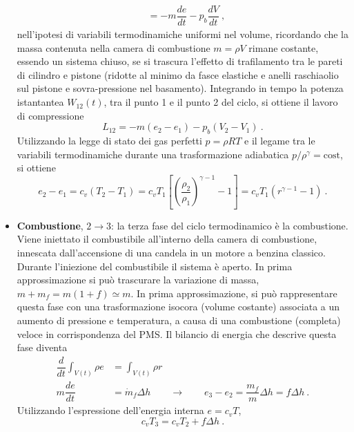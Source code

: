 \begin{itemize}
\begin{equation}
\begin{aligned}
  & = - m \dfrac{d e}{d t} - p_b \dfrac{d V}{d t} \ ,
\end{aligned}
\end{equation}
nell'ipotesi di variabili termodinamiche uniformi nel volume, ricordando che la massa contenuta nella camera di combustione $m = \rho V$ rimane costante, essendo un sistema chiuso, se si trascura l'effetto di trafilamento tra le pareti di cilindro e pistone (ridotte al minimo da fasce elastiche e anelli raschiaolio sul pistone e sovra-pressione nel basamento).
\newline \noindent
Integrando in tempo la potenza istantantea $W_{12}(t)$, tra il punto 1 e il punto 2 del ciclo, si ottiene il lavoro di compressione
\begin{equation}
 L_{12} = - m (e_2 - e_1) - p_b ( V_2 - V_1 ) \ .
\end{equation}
Utilizzando la legge di stato dei gas perfetti $p = \rho R T$ e il legame tra le variabili termodinamiche durante una trasformazione adiabatica $p/\rho^\gamma = \text{cost}$, si ottiene
\begin{equation}
 e_2 - e_1 = c_v ( T_2 - T_1 ) = c_v T_1 \left[ \left( \dfrac{\rho_2}{\rho_1} \right)^{\gamma-1} - 1 \right] = c_v T_1 \left( r^{\gamma-1} - 1\right) \ .
\end{equation}

\item \textbf{Combustione}, $2 \rightarrow 3$: la terza fase del ciclo termodinamico è la combustione. Viene iniettato il combustibile all'interno della camera di combustione, innescata dall'accensione di una candela in un motore a benzina classico. Durante l'iniezione del combustibile il sistema è aperto. In prima approssimazione si può trascurare la variazione di massa, $m + m_f = m ( 1 + f ) \simeq m$. In prima approssimazione, si può rappresentare questa fase con una trasformazione isocora (volume costante) associata a un aumento di pressione e temperatura, a causa di una combustione (completa) veloce in corrispondenza del PMS. Il bilancio di energia che descrive questa fase diventa
\begin{equation}
\begin{aligned}
 \dfrac{d}{dt} \displaystyle\int_{V(t)} \rho e & = \int_{V(t)} \rho r \\
 m \dfrac{d e}{d t} & = \dot{m}_f \Delta h \qquad \rightarrow \qquad
 e_3 - e_2 = \dfrac{ m_f }{ m } \Delta h  = f \Delta h \ .
\end{aligned}
\end{equation}
Utilizzando l'espressione dell'energia interna $e = c_v T$,
\begin{equation}
 c_v T_3 = c_v T_2 + f \Delta h \ .
\end{equation}


\end{itemize}
